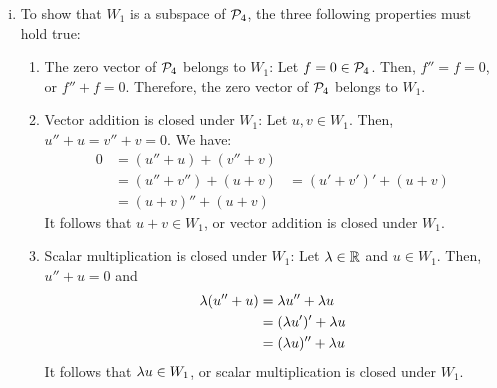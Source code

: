 \begin{sol}
\begin{enumerate}[(i)]
    \item To show that $W_1$ is a subspace of $\P_4$, the three following properties must hold true:
    \begin{enumerate}[(1)]
        \item The zero vector of $\P_4$ belongs to $W_1$: Let $f=0\in\P_4$. Then, $f''=f=0$, or $f''+f=0$. Therefore, the zero vector of $\P_4$ belongs to $W_1$.
        \item Vector addition is closed under $W_1$: Let $u,v\in W_1$. Then, $u''+u=v''+v=0$. We have:
        \[
            \begin{aligned}
                0 &= (u''+u)+(v''+v)\\
                  &= (u''+v'')+(u+v)
                  &= (u'+v')'+(u+v)\\
                  &= (u+v)''+(u+v)
            \end{aligned}
        \]
        It follows that $u+v\in W_1$, or vector addition is closed under $W_1$.
        \item Scalar multiplication is closed under $W_1$: Let $\lam\in\R$ and $u\in W_1$. Then, $u''+u=0$ and
        \[
            \begin{aligned}
                \lam(u''+u) &= \lam u''+\lam u\\
                            &= (\lam u')'+\lam u\\
                            &= (\lam u)''+\lam u
            \end{aligned}
        \]
        It follows that $\lam u\in W_1$, or scalar multiplication is closed under $W_1$.


\end{enumerate}
\end{enumerate}
\end{sol}

